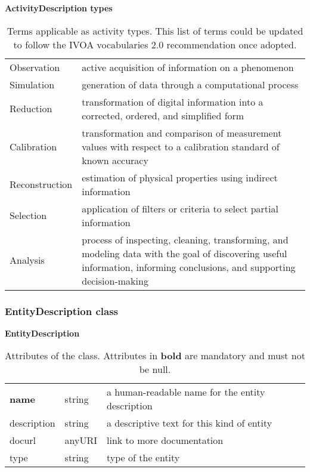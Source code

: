 \begin{table}[ht]
\small
{}\textwidth
\textbf{\normalsize ActivityDescription types}\vspace{0.25em}\\
\begin{tabulary}{1.0\textwidth}{lp{8cm}}
\toprule
{} &  \\
\midrule
Observation    & active acquisition of information on a phenomenon\\
Simulation     & generation of data through a computational process\\
Reduction      & transformation of digital information into a corrected, ordered, and simplified form\\
Calibration    & transformation and comparison of measurement values with respect to a calibration standard of known accuracy\\
Reconstruction & estimation of physical properties using indirect information\\
Selection      & application of filters or criteria to select partial information\\
Analysis       & process of inspecting, cleaning, transforming, and modeling data with the goal of discovering useful information, informing conclusions, and supporting decision-making\\
\bottomrule
\end{tabulary}
\caption[Terms applicable as activity types.]{Terms applicable as activity types. This list of terms could be updated to follow the IVOA vocabularies 2.0 recommendation once adopted.}
\label{tab:activitydescription-types}
\end{table}



\subsubsection{EntityDescription class}
\label{sec:entity_desc}


\begin{table}[ht]
\small
{}\textwidth
\textbf{\normalsize EntityDescription}\vspace{0.25em}\\
\begin{tabulary}{\textwidth}{llL}
\toprule
{} &  & \\
\midrule
\textbf{name}       & string & a human-readable name for the entity description\\
description  & string & a descriptive text for this kind of entity\\
docurl   & anyURI & link to more documentation\\
type      & string & type of the entity\\
\bottomrule
\end{tabulary}
\caption[Attributes of the  class]{Attributes of the  class. Attributes in \textbf{bold} are mandatory and must not be null.
}\label{tab:entitydescription}
\end{table}


